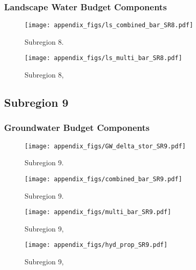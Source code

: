 \subsubsection{Landscape Water Budget Components}
\begin{figure}[ht]
\centerline{\texttt{[image: appendix\_figs/ls\_combined\_bar\_SR8.pdf]}}
\caption{\LSCombinedTextOne Subregion 8.\LSCombinedTextTwo}
\label{fig:LS_budget_SR8}
\end{figure}
\newpage

\begin{landscape}
\begin{figure}[ht]
\centerline{\texttt{[image: appendix\_figs/ls\_multi\_bar\_SR8.pdf]}}
\caption{\LSMultiTextOne Subregion 8,\LSMultiTextTwo}
\label{fig:multi_LS_budget_SR8}
\end{figure}
\newpage
\end{landscape}

\subsection{Subregion 9}
\subsubsection{Groundwater Budget Components}
\begin{figure}[h]
\centerline{\texttt{[image: appendix\_figs/GW\_delta\_stor\_SR9.pdf]}}
\caption{\GWBudgetText Subregion 9.}
\label{fig:delta_stor_SR9}
\end{figure}
\newpage

\begin{figure}[ht]
\centerline{\texttt{[image: appendix\_figs/combined\_bar\_SR9.pdf]}}
\caption{\GWCombinedTextOne Subregion 9.\GWCombinedTextTwo}
\label{fig:GW_budget_SR9}
\end{figure}
\newpage

\begin{landscape}
\begin{figure}[ht]
\centerline{\texttt{[image: appendix\_figs/multi\_bar\_SR9.pdf]}}
\caption{\GWMultiTextOne Subregion 9,\GWMultiTextTwo}
\label{fig:multi_GW_budget_SR9}
\end{figure}
\newpage

\begin{figure}[ht]
\centerline{\texttt{[image: appendix\_figs/hyd\_prop\_SR9.pdf]}}
\caption{\HydPropOne Subregion 9,\HydPropTwo}
\label{fig:hyd_prop_SR9}
\end{figure}
\newpage
\end{landscape}

